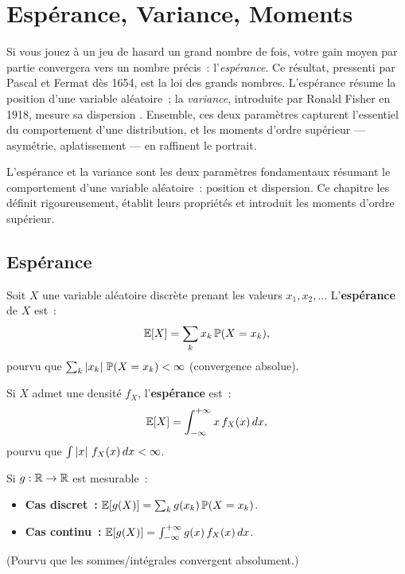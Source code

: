 \chapter{Esp\'erance, Variance, Moments}
\label{ch:esperance}

Si vous jouez \`a un jeu de hasard un grand nombre de fois, votre gain moyen par partie convergera vers un nombre pr\'ecis~: l'\emph{esp\'erance}. Ce r\'esultat, pressenti par Pascal et Fermat d\`es 1654, est la loi des grands nombres. L'esp\'erance r\'esume la \og position \fg d'une variable al\'eatoire~; la \emph{variance}, introduite par Ronald Fisher en 1918, mesure sa \og dispersion \fg. Ensemble, ces deux param\`etres capturent l'essentiel du comportement d'une distribution, et les moments d'ordre sup\'erieur --- asym\'etrie, aplatissement --- en raffinent le portrait.

\begin{intuition}
L'esp\'erance et la variance sont les deux param\`etres fondamentaux r\'esumant
le comportement d'une variable al\'eatoire~: position et dispersion. Ce chapitre
les d\'efinit rigoureusement, \'etablit leurs propri\'et\'es et introduit les
moments d'ordre sup\'erieur.
\end{intuition}

\section{Esp\'erance}

\begin{definition}
Soit $X$ une variable al\'eatoire discr\`ete prenant les valeurs $x_1, x_2, \ldots$
L'\textbf{esp\'erance} de $X$ est~:
\[
    \mathbb{E}[X] = \sum_{k} x_k\, \mathbb{P}(X = x_k),
\]
pourvu que $\sum_k \left| x_k \right|\, \mathbb{P}(X = x_k) < \infty$ (convergence absolue).
\end{definition}

\begin{definition}
Si $X$ admet une densit\'e $f_X$, l'\textbf{esp\'erance} est~:
\[
    \mathbb{E}[X] = \int_{-\infty}^{+\infty} x\, f_X(x)\, dx,
\]
pourvu que $\int \left| x \right|\, f_X(x)\, dx < \infty$.
\end{definition}

\begin{theoreme}
\label{thm:lotus}
Si $g : \mathbb{R} \to \mathbb{R}$ est mesurable~:
\begin{itemize}
    \item \textbf{Cas discret~:}
    $\mathbb{E}[g(X)] = \sum_k g(x_k)\, \mathbb{P}(X = x_k)$.
    \item \textbf{Cas continu~:}
    $\mathbb{E}[g(X)] = \int_{-\infty}^{+\infty} g(x)\, f_X(x)\, dx$.
\end{itemize}
(Pourvu que les sommes/int\'egrales convergent absolument.)
\end{theoreme}

